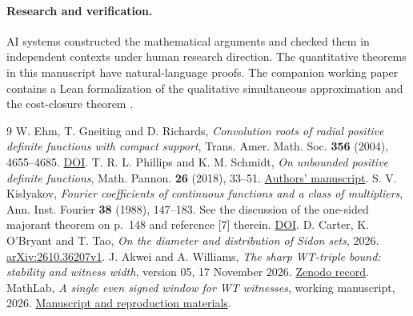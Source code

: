 \documentclass[11pt]{article}
\begin{document}
\paragraph{Research and verification.}
AI systems constructed the mathematical arguments and checked them in independent contexts under human research direction. The quantitative theorems in this manuscript have natural-language proofs. The companion working paper contains a Lean formalization of the qualitative simultaneous approximation and the cost-closure theorem \cite{ml}.

\begin{thebibliography}{9}
 W. Ehm, T. Gneiting and D. Richards, \emph{Convolution roots of radial positive definite functions with compact support}, Trans. Amer. Math. Soc. \textbf{356} (2004), 4655--4685. \href{https://doi.org/10.1090/S0002-9947-04-03502-0}{DOI}.
 T. R. L. Phillips and K. M. Schmidt, \emph{On unbounded positive definite functions}, Math. Pannon. \textbf{26} (2018), 33--51. \href{https://orca.cardiff.ac.uk/id/eprint/115573/1/Bochner4c.pdf}{Authors' manuscript}.
 S. V. Kislyakov, \emph{Fourier coefficients of continuous functions and a class of multipliers}, Ann. Inst. Fourier \textbf{38} (1988), 147--183. See the discussion of the one-sided majorant theorem on p.~148 and reference [7] therein. \href{https://doi.org/10.5802/aif.1138}{DOI}.
 D. Carter, K. O'Bryant and T. Tao, \emph{On the diameter and distribution of Sidon sets}, 2026. \href{https://arxiv.org/abs/2610.36207v1}{arXiv:2610.36207v1}.
 J. Akwei and A. Williams, \emph{The sharp WT-triple bound: stability and witness width}, version 05, 17 November 2026. \href{https://doi.org/10.5281/zenodo.24326518}{Zenodo record}.
 MathLab, \emph{A single even signed window for WT witnesses}, working manuscript, 2026. \href{https://github.com/F1Justin/MathLab/tree/ae92acdcae0f6bd718a9cdfb3e537606f86f0336/papers/wt-derandomization}{Manuscript and reproduction materials}.
\end{thebibliography}
\end{document}
